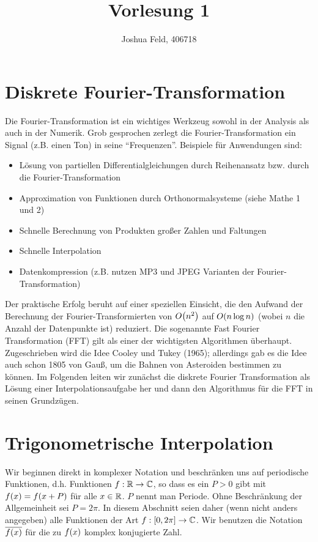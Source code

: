 \documentclass{lecture}
\institute{Applied and Computational Mathematics}
\title{Vorlesung 1}
\author{Joshua Feld, 406718}
\begin{document}
    \maketitle


    \section*{Diskrete Fourier-Transformation}

    Die Fourier-Transformation ist ein wichtiges Werkzeug sowohl in der Analysis als auch in der Numerik.
    Grob gesprochen zerlegt die Fourier-Transformation ein Signal (z.B. einen Ton) in seine ``Frequenzen''.
    Beispiele für Anwendungen sind:
    \begin{itemize}
        \item Lösung von partiellen Differentialgleichungen durch Reihenansatz bzw. durch die Fourier-Transformation
        \item Approximation von Funktionen durch Orthonormalsysteme (siehe Mathe 1 und 2)
        \item Schnelle Berechnung von Produkten großer Zahlen und Faltungen
        \item Schnelle Interpolation
        \item Datenkompression (z.B. nutzen MP3 und JPEG Varianten der Fourier-Transformation)
    \end{itemize}
    Der praktische Erfolg beruht auf einer speziellen Einsicht, die den Aufwand der Berechnung der Fourier-Transformierten von \(O\parentheses*{n^2}\) auf \(O\parentheses*{n\log n}\) (wobei \(n\) die Anzahl der Datenpunkte ist) reduziert.
    Die sogenannte Fast Fourier Transformation (FFT) gilt als einer der wichtigsten Algorithmen überhaupt.
    Zugeschrieben wird die Idee Cooley und Tukey (1965); allerdings gab es die Idee auch schon 1805 von Gauß, um die Bahnen von Asteroiden bestimmen zu können.
    Im Folgenden leiten wir zunächst die diskrete Fourier Transformation als Lösung einer Interpolationsaufgabe her und dann den Algorithmus für die FFT in seinen Grundzügen.


    \section*{Trigonometrische Interpolation}

    Wir beginnen direkt in komplexer Notation und beschränken uns auf periodische Funktionen, d.h. Funktionen \(f: \R \to \C\), so dass es ein \(P > 0\) gibt mit \(f\parentheses*{x} = f\parentheses*{x + P}\) für alle \(x \in \R\).
    \(P\) nennt man Periode.
    Ohne Beschränkung der Allgemeinheit sei \(P = 2\pi\).
    In diesem Abschnitt seien daher (wenn nicht anders angegeben) alle Funktionen der Art \(f: \brackets*{0, 2\pi} \to \C\).
    Wir benutzen die Notation \(\overline{f\parentheses*{x}}\) für die zu \(f\parentheses*{x}\) komplex konjugierte Zahl.
\end{document}
